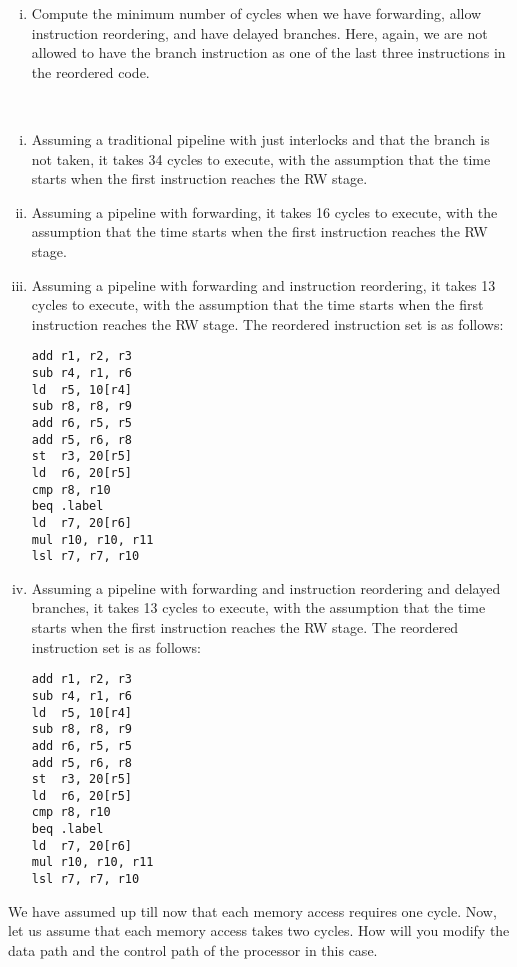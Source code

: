 \begin{ExerciseList}
\begin{enumerate}[i) ]
\item Compute the minimum number of cycles when we have forwarding, allow instruction reordering, and have
delayed branches. Here, again, we are not allowed to have the branch instruction as one of the last three
instructions in the reordered code.
\end{enumerate}
\Answer
\hspace{1mm} \\
\begin{enumerate}[i) ]
\item 
Assuming a traditional \simplerisc pipeline with just interlocks and that the branch is not taken, it takes 34 cycles to execute, with the assumption that the time starts when the first instruction reaches the RW stage. 
\item  
Assuming a \simplerisc pipeline with forwarding, it takes 16 cycles to execute, with the assumption that the time starts when the first instruction reaches the RW stage.
\item 
Assuming a \simplerisc pipeline with forwarding and instruction reordering, it takes 13 cycles to execute, with the assumption that the time starts when the first instruction reaches the RW stage.
The reordered instruction set is as follows: \\
\begin{verbatim}
add r1, r2, r3
sub r4, r1, r6
ld  r5, 10[r4]
sub r8, r8, r9
add r6, r5, r5
add r5, r6, r8
st  r3, 20[r5]
ld  r6, 20[r5]
cmp r8, r10
beq .label
ld  r7, 20[r6]
mul r10, r10, r11
lsl r7, r7, r10
\end{verbatim} 
\item 
Assuming a \simplerisc pipeline with forwarding and instruction reordering and delayed branches, it takes 13 cycles to execute, with the assumption that the time starts when the first instruction reaches the RW stage.
The reordered instruction set is as follows: \\
\begin{verbatim}
add r1, r2, r3
sub r4, r1, r6
ld  r5, 10[r4]
sub r8, r8, r9
add r6, r5, r5
add r5, r6, r8
st  r3, 20[r5]
ld  r6, 20[r5]
cmp r8, r10
beq .label
ld  r7, 20[r6]
mul r10, r10, r11
lsl r7, r7, r10
\end{verbatim} 
\end{enumerate}
\Exercise[difficulty=2]
We have assumed up till now that each memory access requires one cycle. Now, let us assume that each
memory access takes two cycles. How will you modify the data path and the control path of the \simplerisc
processor in this case.


\end{ExerciseList}

